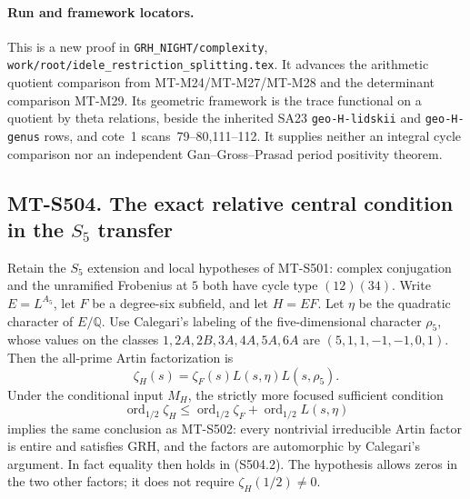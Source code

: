\paragraph{Run and framework locators.}
This is a new proof in
\texttt{GRH\_NIGHT/complexity},
\texttt{work/root/idele\_restriction\_splitting.tex}.
It advances the arithmetic
quotient comparison from
MT-M24/MT-M27/MT-M28 and
the determinant comparison
MT-M29. Its geometric
framework is the trace
functional on a quotient
by theta relations, beside
the inherited SA23
\texttt{geo-H-lidskii}
and \texttt{geo-H-genus}
rows, and cote~1
scans~79--80,111--112.
It supplies neither an
integral cycle comparison
nor an independent
Gan--Gross--Prasad
period positivity theorem.

\subsection*{MT-S504. The exact relative central condition in the $S_5$ transfer}

Retain the $S_5$ extension and local hypotheses of MT-S501:
complex conjugation and the unramified Frobenius at $5$ both
have cycle type $(12)(34)$. Write $E=L^{A_5}$, let $F$
be a degree-six subfield, and let $H=EF$. Let $\eta$ be the
quadratic character of $E/\mathbb Q$. Use Calegari's labeling
of the five-dimensional character $\rho_5$, whose values on
the classes $1,2A,2B,3A,4A,5A,6A$ are
$(5,1,1,-1,-1,0,1)$. Then the all-prime Artin factorization is
\[
       \zeta_H(s)=\zeta_F(s)L(s,\eta)L(s,\rho_5).
 \tag{S504.1}
\]
Under the conditional input $M_H$, the strictly more focused
sufficient condition
\[
 \operatorname{ord}_{1/2}\zeta_H
       \le\operatorname{ord}_{1/2}\zeta_F
                     +\operatorname{ord}_{1/2}L(s,\eta)
 \tag{S504.2}
\]
implies the same conclusion as MT-S502: every nontrivial
irreducible Artin factor is entire and satisfies GRH, and
the factors are automorphic by Calegari's argument.
In fact equality then holds in (S504.2). The hypothesis
allows zeros in the two other factors; it does not require
$\zeta_H(1/2)\ne0$.

